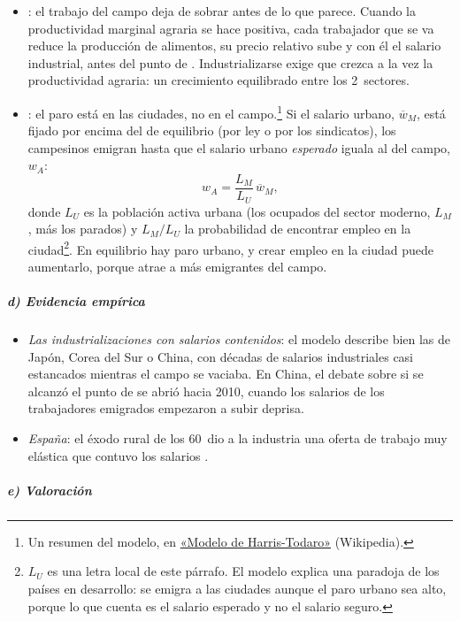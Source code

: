 \documentclass[11pt]{article}
\begin{document}
\begin{itemize}
\item \emph{\textcite{RanisFei1961}}: el trabajo del campo deja de sobrar antes de lo que parece. Cuando la productividad marginal agraria se hace positiva, cada trabajador que se va reduce la producción de alimentos, su precio relativo sube y con él el salario industrial, antes del punto de . Industrializarse exige que crezca a la vez la productividad agraria: un crecimiento equilibrado entre los 2~sectores.
\item \emph{\textcite{HarrisTodaro1970}}: el paro está en las ciudades, no en el campo.\footnote{Un resumen del modelo, en \href{https://es.wikipedia.org/wiki/Modelo_de_Harris-Todaro}{«Modelo de Harris-Todaro»} (Wikipedia).} Si el salario urbano, $\overline w_M$, está fijado por encima del de equilibrio (por ley o por los sindicatos), los campesinos emigran hasta que el salario urbano \emph{esperado} iguala al del campo, $w_A$:
  \[
  w_A=\frac{L_M}{L_U}\,\overline w_M ,
  \]
  donde $L_U$ es la población activa urbana (los ocupados del sector moderno, $L_M$, más los parados) y $L_M/L_U$ la probabilidad de encontrar empleo en la ciudad\footnote{$L_U$ es una letra local de este párrafo. El modelo explica una paradoja de los países en desarrollo: se emigra a las ciudades aunque el paro urbano sea alto, porque lo que cuenta es el salario esperado y no el salario seguro.}. En equilibrio hay paro urbano, y crear empleo en la ciudad puede aumentarlo, porque atrae a más emigrantes del campo.
\end{itemize}

\subparagraph{d) Evidencia empírica}

\begin{itemize}
\item \emph{Las industrializaciones con salarios contenidos}: el modelo describe bien las de Japón, Corea del Sur o China, con décadas de salarios industriales casi estancados mientras el campo se vaciaba. En China, el debate sobre si se alcanzó el punto de  se abrió hacia 2010, cuando los salarios de los trabajadores emigrados empezaron a subir deprisa\nocite{ZhangYangWang2011}.
\item \emph{España}: el éxodo rural de los 60~dio a la industria una oferta de trabajo muy elástica que contuvo los salarios .
\end{itemize}

\subparagraph{e) Valoración}
\end{document}
